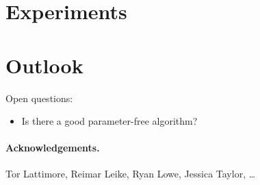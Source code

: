 \documentclass[a4paper]{article}
\begin{document}
\section{Experiments}

\iffalse
Algorithms:
* vanilla DMED (with commitment when 1 arm is selected?)
* partial monitoring algorithm (?)
* optimal stopping time (optimized problem-dependent)
* heuristic (with optimized alpha)

Problems:
* medium query cost c = 2 (>> gap)
  * horizon n = 10k vs gap 0.1 (< n^2/3)
  * horizon n = 1k vs gap 0.1 (~ n^2/3)
  * horizon n = 10k vs gap 0.01 (don't identify the arms)
* high query cost c = 50
  * horizon n = 10k vs gap 0.3 (pay to identify)
  * horizon n = 10k vs gap 0.1 (borderline case)
  * horizon n = 10k vs gap 0.05 (do not pay to identify)
* low query cost c = 0.01 (c << gap)
  * horizon n = 10k vs gap 0.1 (should almost always find the best arm)
  * horizon n = 200 vs gap 0.1 (query all the way?)
\fi


\section{Outlook}

Open questions:
\begin{itemize}
\item Is there a good parameter-free algorithm?
\end{itemize}


\paragraph{Acknowledgements.}
Tor Lattimore, Reimar Leike, Ryan Lowe, Jessica Taylor, \dots


\end{document}
